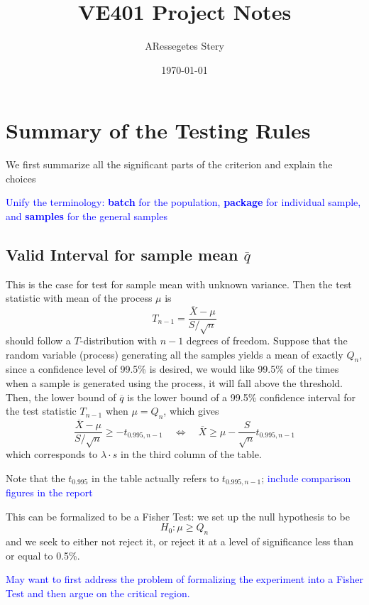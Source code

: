 \documentclass{article}
\title{VE401 Project Notes}
\author{ARessegetes Stery}
\date{\today}
\def\unf#1{\textcolor{blue}{#1}}
\begin{document}
\maketitle

\begin{spacing}{2}
    \tableofcontents
\end{spacing}

\newpage
\section{Summary of the Testing Rules}

We first summarize all the significant parts of the criterion and explain the choices 

\unf{Unify the terminology: \textbf{batch} for the population, \textbf{package} for individual sample, and \textbf{samples} for the general samples}

\subsection{Valid Interval for sample mean $\overline{q}$}

This is the case for test for sample mean with unknown variance. Then the test statistic with mean of the process $\mu$ is 
$$
T_{n-1} = \dfrac{\overline{X} - \mu}{S/\sqrt{n}}
$$
should follow a $T$-distribution with $n-1$ degrees of freedom. Suppose that the random variable (process) generating all the samples yields a mean of exactly $Q_n$, since a confidence level of 99.5\% is desired, we would like 99.5\% of the times when a sample is generated using the process, it will fall above the threshold. Then, the lower bound of $\overline{q}$ is the lower bound of a 99.5\% confidence interval for the test statistic $T_{n-1}$ when $\mu = Q_n$, which gives
$$
\dfrac{\overline{X} - \mu}{S/\sqrt{n}} \geq -t_{0.995, n-1} \quad\Leftrightarrow\quad \overline{X}\geq\mu-\dfrac{S}{\sqrt{n}}t_{0.995, n-1}
$$ 
which corresponds to $\lambda\cdot s$ in the third column of the table. 

Note that the $t_{0.995}$ in the table actually refers to $t_{0.995, n-1}$; \unf{include comparison figures in the report}

This can be formalized to be a Fisher Test: we set up the null hypothesis to be
$$
H_0: \mu \geq Q_n
$$
and we seek to either not reject it, or reject it at a level of significance less than or equal to 0.5\%. 

\unf{May want to first address the problem of formalizing the experiment into a Fisher Test and then argue on the critical region.}
\end{document}
